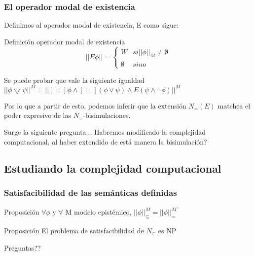 \documentclass{beamer}
\begin{document}
\begin{frame}
\frametitle{El operador modal de existencia}

Definimos al operador modal de existencia, E como sigue:

\begin{block}{Definici\'on operador modal de existencia}
\[ ||E\phi|| = \begin{cases} 
      W & si ||\phi||_{M} \neq \emptyset \\
      \emptyset & sino
   \end{cases}
\]
\end{block}

Se puede probar que vale la siguiente igualdad
$||\phi \bigtriangledown \psi||^{M} = ||[=]\phi \land [=](\phi \lor \psi) \land E(\psi \land \neg \phi)||^{M}$

Por lo que a partir de esto, podemos inferir que la extensi\'on $N_{=}(E)$ matchea el poder expresivo de las $N_{=}$-bisimulaciones.

Surge la siguiente pregunta... Habremos modificado la complejidad computacional, al haber extendido de est\'a manera la bisimulaci\'on?
\end{frame}

\subsection{Estudiando la complejidad computacional}

\begin{frame}
\frametitle {Satisfacibilidad de las sem\'anticas definidas}

\begin{block}{Proposici\'on}
$\forall \phi$ y $\forall$ M modelo epist\'emico, $||\phi||_{\subseteq}^{M} = ||\phi||_{=}^{M^{+}}$ 
\end{block}

\begin{block}{Proposici\'on}
El problema de satisfacibilidad de $N_{\subseteq}$ es NP
\end{block}

\end{frame}

\begin{frame}
\Huge{\centerline{Preguntas??}}
\end{frame}

\end{document}

